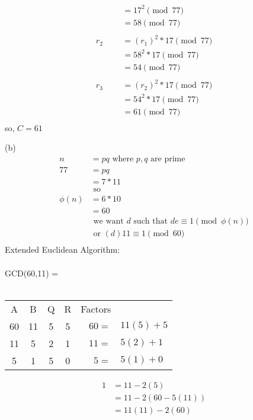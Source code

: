 \documentclass{assignment}
\begin{document}
\begin{flushleft}
\begin{problemlist}
\begin{singlespace}
\begin{align*}
&= 17^2 \pmod {77}\\ 
&= 58 \pmod {77}\\
\hspace{1cm}\\
r_2 &= (r_1)^2 * 17 \pmod {77}\\
&= 58^2 * 17 \pmod {77}\\
&= 54 \pmod {77}\\
\hspace{1cm}\\
r_3 &= (r_2)^2 * 17 \pmod {77}\\
&= 54^2 * 17 \pmod {77}\\
&= 61 \pmod {77}\\
\end{align*}
so, $C = 61$\\
\end{singlespace}
\newpage
\item [(b)] 
\begin{align*}
n &= pq \text{ where } p,q  \text{ are prime }\\
77 &= pq\\
&= 7 * 11\\
&\text{ so }\\
\phi(n) &= 6 * 10\\
&=60\\ 
&\text{ we want } d \text{ such that } de \equiv 1 \pmod {\phi(n)}\\
&\text{ or } (d)11 \equiv 1 \pmod{60}\\
\end{align*}
Extended Euclidean Algorithm:\\
\hspace{1cm}\\
GCD(60,11) = \\
\hspace{1cm}\\
\begin{tabular}{c c c c r l}
A &B &Q &R &\hspace{0.5cm} Factors &\hspace{1cm}\\
60 &11 &5 &5 &$60=$&$11(5) + 5$\\
11 &5 &2 &1 &$11=$&$5(2) + 1$\\
5 &1 &5 &0 &$5=$&$5(1) + 0$\\
\end{tabular}
\begin{align*}
1 &= 11 - 2(5)\\
&= 11 - 2(60 -5(11))\\
&= 11(11) - 2(60)\\

\end{align*}
\end{problemlist}
\end{flushleft}
\end{document}
